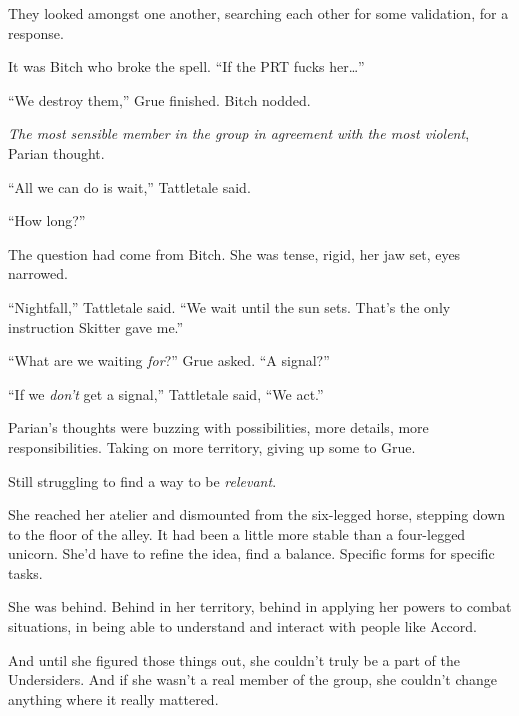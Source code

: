 They looked amongst one another, searching each other for some validation, for a response.



It was Bitch who broke the spell.  ``If the PRT fucks her\ldots''



``We destroy them,'' Grue finished.  Bitch nodded.



\emph{The most sensible member in the group in agreement with the most violent}, Parian thought.



``All we can do is wait,'' Tattletale said.



``How long?''



The question had come from Bitch.  She was tense, rigid, her jaw set, eyes narrowed.



``Nightfall,'' Tattletale said.  ``We wait until the sun sets.  That's the only instruction Skitter gave me.''



``What are we waiting \emph{for}?'' Grue asked.  ``A signal?''



``If we \emph{don't} get a signal,'' Tattletale said, ``We act.''



\sectionbreak



Parian's thoughts were buzzing with possibilities, more details, more responsibilities.  Taking on more territory, giving up some to Grue.



Still struggling to find a way to be \emph{relevant}.



She reached her atelier and dismounted from the six-legged horse, stepping down to the floor of the alley.  It had been a little more stable than a four-legged unicorn.  She'd have to refine the idea, find a balance.  Specific forms for specific tasks.



She was behind.  Behind in her territory, behind in applying her powers to combat situations, in being able to understand and interact with people like Accord.



And until she figured those things out, she couldn't truly be a part of the Undersiders.  And if she wasn't a real member of the group, she couldn't change anything where it really mattered.



